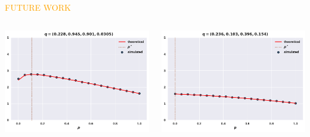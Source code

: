 \documentclass[usenames,dvipsnames,t]{beamer}
\begin{document}
\begin{columns}
\begin{column}{.2\linewidth}
        \begin{center}
            \textcolor{orange}{\Large{FUTURE WORK}}
        \end{center}
    \begin{center}
        
    \end{center}
    \end{column}
\end{columns}
\begin{columns}
    \begin{column}{.2\linewidth}
        \includegraphics[width=\textwidth]{static/plot_one}
    \end{column}
    \begin{column}{.2\linewidth}
        \includegraphics[width=\textwidth]{static/plot_two}

\end{column}
\end{columns}
\end{document}
